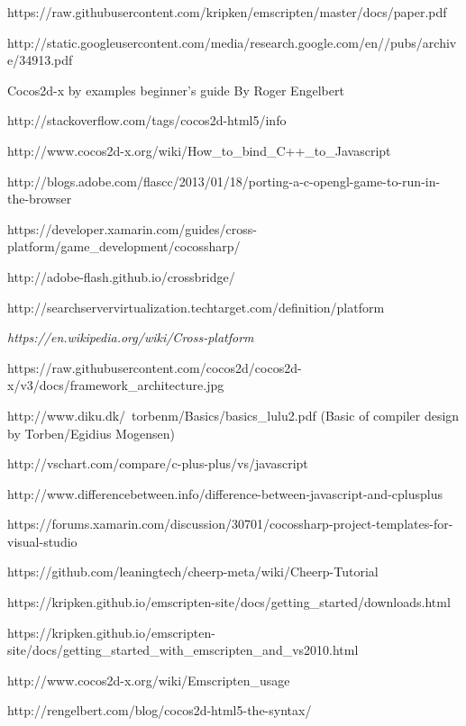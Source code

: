 \documentclass[23pt]{article}
\begin{document}
\begin{thebibliography}{9}

{https://raw.githubusercontent.com/kripken/emscripten/master/docs/paper.pdf}

{http://static.googleusercontent.com/media/research.google.com/en//pubs/archive/34913.pdf}


{Cocos2d-x by examples beginner’s guide By Roger Engelbert}

{http://stackoverflow.com/tags/cocos2d-html5/info}


{http://www.cocos2d-x.org/wiki/How\_to\_bind\_C++\_to\_Javascript}

{http://blogs.adobe.com/flascc/2013/01/18/porting-a-c-opengl-game-to-run-in-the-browser}

{https://developer.xamarin.com/guides/cross-platform/game\_development/cocossharp/}


{http://adobe-flash.github.io/crossbridge/}


{http://searchservervirtualization.techtarget.com/definition/platform}


\textit{https://en.wikipedia.org/wiki/Cross-platform}


{https://raw.githubusercontent.com/cocos2d/cocos2d-x/v3/docs/framework\_architecture.jpg}

{http://www.diku.dk/~torbenm/Basics/basics\_lulu2.pdf (Basic of compiler design by Torben/Egidius Mogensen)}


{http://vschart.com/compare/c-plus-plus/vs/javascript}


{http://www.differencebetween.info/difference-between-javascript-and-cplusplus}


{https://forums.xamarin.com/discussion/30701/cocossharp-project-templates-for-visual-studio}

{https://github.com/leaningtech/cheerp-meta/wiki/Cheerp-Tutorial}

{https://kripken.github.io/emscripten-site/docs/getting\_started/downloads.html}

{https://kripken.github.io/emscripten-site/docs/getting\_started\_with\_emscripten\_and\_vs2010.html}

{http://www.cocos2d-x.org/wiki/Emscripten\_usage}

{http://rengelbert.com/blog/cocos2d-html5-the-syntax/}



\end{thebibliography}
\end{document}
